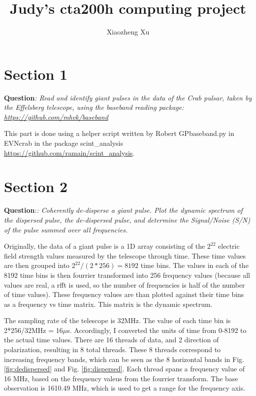 \documentclass[apj]{emulateapj}
\begin{document}
\title{Judy's cta200h computing project}
 
\author{Xiaozheng Xu}





\section{Section 1}
\label{sec:1}
\textbf{Question}\textit{: Read and identify giant pulses in the data of the Crab pulsar, taken by the Effelsberg telescope, using the baseband reading package: \url{https://github.com/mhvk/baseband}}



This part is done using a helper script written by Robert GPbaseband.py in EVNcrab in the package scint\_analysis  \url{https://github.com/ramain/scint_analysis}. 

\section{Section 2}
\label{sec:2}
\textbf{Question}:\textit{: Coherently de-disperse a giant pulse. Plot the dynamic spectrum of the dispersed pulse, the de-dispersed pulse, and determine the Signal/Noise (S/N) of the pulse summed over all frequencies.}


Originally, the data of a giant pulse is a 1D array consisting of the $2^{22}$ electric field strength values measured by the telescope through time. These time values are then grouped into $2^{22}/(2*256) = 8192$ time bins. The values in each of the 8192 time bins is then fourrier transformed into 256 frequency values (because all values are real, a rfft is used, so the number of frequencies is half of the number of time values). These frequency values are than plotted against their time bins as a frequency vs time matrix. This matrix is the dynamic spectrum. 

The sampling rate of the telescope is 32MHz. The value of each time bin is 2*256/32MHz = 16$\mu$s. Accordingly, I converted the units of time from 0-8192 to the actual time values. There are 16 threads of data, and 2 direction of polarization, resulting in 8 total threads. These 8 threads correspond to increasing frequency bands, which can be seen as the 8 horizontal bands in Fig. \ref{fig:dedispersed} and Fig. \ref{fig:dispersed}. Each thread spans a frequency value of 16 MHz, based on the frequency valeus from the fourrier transform. The base observation is 1610.49 MHz, which is used to get a range for the frequency axis. 
\end{document}

